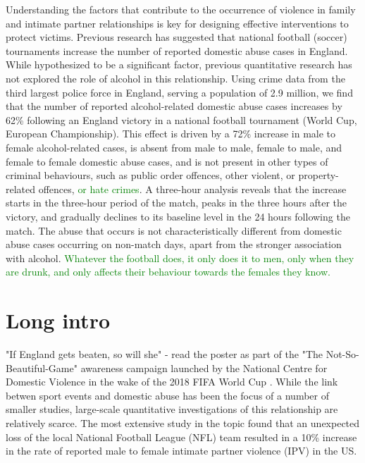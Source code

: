 \documentclass[12pt, letterpaper]{article}
\newcommand{\NS}[1] {{\textcolor{green}{#1}}}
\begin{document}
Understanding the factors that contribute to the occurrence of violence in family and intimate partner relationships is key for designing effective interventions to protect victims. Previous research has suggested that national football (soccer) tournaments increase the number of reported domestic abuse cases in England\autocite{Kirby2014, Brimicombe2012}. While hypothesized to be a significant factor, previous quantitative research has not explored the role of alcohol in this relationship. Using crime data from the third largest police force in England, serving a population of 2.9 million\autocite{populationfigure}, we find that the number of reported alcohol-related domestic abuse cases increases by 62\% following an England victory in a national football tournament (World Cup, European Championship). This effect is driven by a 72\% increase in male to female alcohol-related cases, is absent from male to male, female to male, and female to female domestic abuse cases, and is not present in other types of criminal behaviours, such as public order offences, other violent, or property-related offences, \NS{or hate crimes}. A three-hour analysis reveals that the increase starts in the three-hour period of the match, peaks in the three hours after the victory, and gradually declines to its baseline level in the 24 hours following the match. The abuse that occurs is not characteristically different from domestic abuse cases occurring on non-match days, apart from the stronger association with alcohol. \NS{Whatever the football does, it only does it to men, only when they are drunk, and only affects their behaviour towards the females they know.}

\section{Long intro}

"If England gets beaten, so will she" - read the poster as part of the "The Not-So-Beautiful-Game" awareness campaign launched by the National Centre for Domestic Violence in the wake of the 2018 FIFA World Cup \autocite{NCDV}. While the link betwen sport events and domestic abuse has been the focus of a number of smaller studies\autocite{Williams2014}, large-scale quantitative investigations of this relationship are relatively scarce. The most extensive study in the topic found that an unexpected loss of the local National Football League (NFL) team resulted in a 10\% increase in the rate of reported male to female intimate partner violence (IPV) in the US\autocite{Card2011}. 
\end{document}

